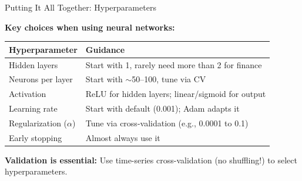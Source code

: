 \documentclass[10pt]{beamer}
\begin{document}
\begin{frame}{Putting It All Together: Hyperparameters}

  \textbf{Key choices when using neural networks:}

  \vspace{0.5em}
  \begin{center}
  \begin{tabular}{lp{6cm}}
    \toprule
    \textbf{Hyperparameter} & \textbf{Guidance} \\
    \midrule
    Hidden layers & Start with 1, rarely need more than 2 for finance \\
    Neurons per layer & Start with $\sim$50--100, tune via CV \\
    Activation & ReLU for hidden layers; linear/sigmoid for output \\
    Learning rate & Start with default (0.001); Adam adapts it \\
    Regularization ($\alpha$) & Tune via cross-validation (e.g., 0.0001 to 0.1) \\
    Early stopping & Almost always use it \\
    \bottomrule
  \end{tabular}
  \end{center}

  \vspace{1em}
  \textbf{Validation is essential:} Use time-series cross-validation (no shuffling!) to select hyperparameters.
\end{frame}

\end{document}
